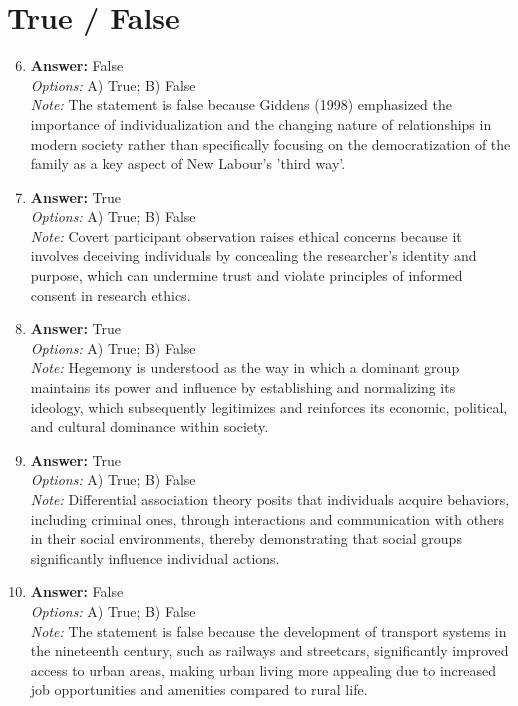 \documentclass[12pt]{article}
\begin{document}
\section*{True / False}
\begin{enumerate}[label=\arabic*.]
\setcounter{enumi}{5}
\item \textbf{Answer:} False
\\ \textit{Options:} A) True; B) False
\\ \textit{Note:} The statement is false because Giddens (1998) emphasized the importance of individualization and the changing nature of relationships in modern society rather than specifically focusing on the democratization of the family as a key aspect of New Labour's 'third way'.
\item \textbf{Answer:} True
\\ \textit{Options:} A) True; B) False
\\ \textit{Note:} Covert participant observation raises ethical concerns because it involves deceiving individuals by concealing the researcher's identity and purpose, which can undermine trust and violate principles of informed consent in research ethics.
\item \textbf{Answer:} True
\\ \textit{Options:} A) True; B) False
\\ \textit{Note:} Hegemony is understood as the way in which a dominant group maintains its power and influence by establishing and normalizing its ideology, which subsequently legitimizes and reinforces its economic, political, and cultural dominance within society.
\item \textbf{Answer:} True
\\ \textit{Options:} A) True; B) False
\\ \textit{Note:} Differential association theory posits that individuals acquire behaviors, including criminal ones, through interactions and communication with others in their social environments, thereby demonstrating that social groups significantly influence individual actions.
\item \textbf{Answer:} False
\\ \textit{Options:} A) True; B) False
\\ \textit{Note:} The statement is false because the development of transport systems in the nineteenth century, such as railways and streetcars, significantly improved access to urban areas, making urban living more appealing due to increased job opportunities and amenities compared to rural life.
\end{enumerate}
\end{document}
